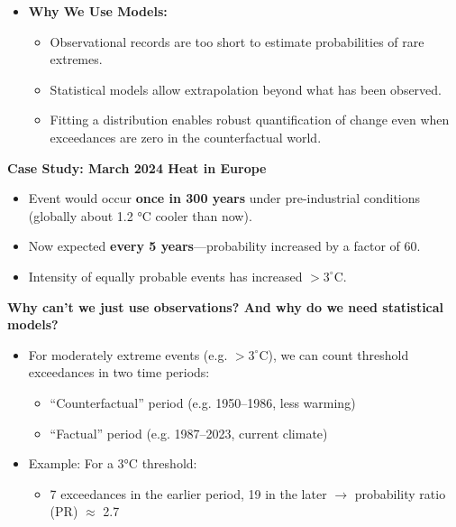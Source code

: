 \documentclass[fontsize=8pt, a4paper, landscape, fleqn]{scrartcl}
\renewcommand{\subsection}[1]{%
    \noindent\colorbox{subsectioncolor}{%
        \parbox{\dimexpr\columnwidth-2\fboxsep}{\color{white}\textbf{#1}}}%
    \vspace{0.5mm}%
}
\begin{document}
\begin{multicols*}{3}[\raggedcolumns]
\begin{itemize}
    \item \textbf{Why We Use Models:}
    \begin{itemize}
        \item Observational records are too short to estimate probabilities of rare extremes.
        \item Statistical models allow extrapolation beyond what has been observed.
        \item Fitting a distribution enables robust quantification of change even when exceedances are zero in the counterfactual world.
    \end{itemize}
\end{itemize}

\subsection{Case Study: March 2024 Heat in Europe}
\begin{itemize}
    \item Event would occur \textbf{once in 300 years} under pre-industrial conditions (globally about 1.2 °C cooler than now).
    \item Now expected \textbf{every 5 years}—probability increased by a factor of 60.
    \item Intensity of equally probable events has
    increased $>3^{\circ}$C.
\end{itemize}

\subsection{Why can’t we just use observations? And why do we need statistical models?}

\begin{itemize}
    \item For moderately extreme events (e.g. $>3^{\circ}$C), we can count threshold exceedances in two time periods:
    \begin{itemize}
        \item “Counterfactual” period (e.g. 1950–1986, less warming)
        \item “Factual” period (e.g. 1987–2023, current climate)
    \end{itemize}
    \item Example: For a 3°C threshold:
    \begin{itemize}
        \item 7 exceedances in the earlier period, 19 in the later $\rightarrow$ probability ratio (PR) $\approx$ 2.7
    \end{itemize}
\end{itemize}


\end{multicols*}
\end{document}
